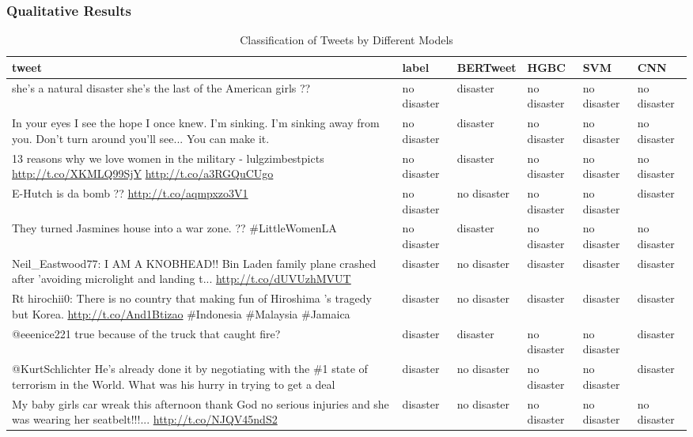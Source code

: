 \documentclass[10pt,table]{article}
\begin{document}
\subsubsection{Qualitative Results}
\begin{table}[h]
    \centering
    \begin{tabular}{|p{6cm}|l|l|l|l|l|}
    \hline
    \textbf{tweet} & \textbf{label} & \textbf{BERTweet} & \textbf{HGBC} & \textbf{SVM} & \textbf{CNN} \\ \hline
    she's a natural disaster she's the last of the American girls ?? & no disaster & disaster & no disaster & no disaster & no disaster \\ \hline
    In your eyes I see the hope I once knew. I'm sinking. I'm sinking away from you. Don't turn around you'll see... You can make it. & no disaster & disaster & no disaster & no disaster & no disaster \\ \hline
    13 reasons why we love women in the military - lulgzimbestpicts \url{http://t.co/XKMLQ99SjY} \url{http://t.co/a3RGQuCUgo} & no disaster & disaster & no disaster & no disaster & no disaster \\ \hline
    E-Hutch is da bomb ?? \url{http://t.co/aqmpxzo3V1} & no disaster & no disaster & no disaster & no disaster & disaster \\ \hline
    They turned Jasmines house into a war zone. ?? \#LittleWomenLA & no disaster & disaster & no disaster & no disaster & no disaster \\ \hline
    Neil\_Eastwood77: I AM A KNOBHEAD!! Bin Laden family plane crashed after 'avoiding microlight and landing t... \url{http://t.co/dUVUzhMVUT} & disaster & no disaster & disaster & disaster & disaster \\ \hline
    Rt hirochii0: There is no country that making fun of Hiroshima 's tragedy but Korea. \url{http://t.co/And1Btizao} \#Indonesia \#Malaysia \#Jamaica & disaster & no disaster & disaster & disaster & disaster \\ \hline
    @eeenice221 true because of the truck that caught fire? & disaster & disaster & no disaster & no disaster & disaster \\ \hline
    @KurtSchlichter He's already done it by negotiating with the \#1 state of terrorism in the World. What was his hurry in trying to get a deal & disaster & no disaster & no disaster & no disaster & disaster \\ \hline
    My baby girls car wreak this afternoon thank God no serious injuries and she was wearing her seatbelt!!!... \url{http://t.co/NJQV45ndS2} & disaster & no disaster & no disaster & no disaster & no disaster \\ \hline
    \end{tabular}
    \caption{Classification of Tweets by Different Models}
    \label{tab:tweets_classification}
\end{table}
\end{document}
